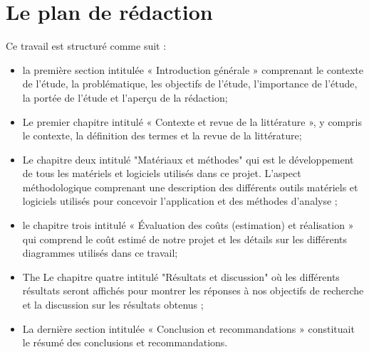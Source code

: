 \documentclass[english,12pt,a4paper]{report}
\begin{document}
\section{Le plan de rédaction }

Ce travail est structuré comme suit :

\begin{itemize}
	\item 	la première section intitulée « Introduction générale » comprenant le contexte de l'étude, la problématique, les objectifs de l'étude, l'importance de l'étude, la portée de l'étude et l'aperçu de la rédaction; 
	\item 	 Le premier chapitre intitulé « Contexte et revue de la littérature », y compris le contexte, la définition des termes et la revue de la littérature; 
	\item 	 Le chapitre deux intitulé "Matériaux et méthodes" qui est le développement de tous les matériels et logiciels utilisés dans ce projet. L'aspect méthodologique comprenant une description des différents outils matériels et logiciels utilisés pour concevoir l'application et des méthodes d'analyse ; 
	\item 	le chapitre trois intitulé « Évaluation des coûts (estimation) et réalisation » qui comprend le coût estimé de notre projet et les détails sur les différents diagrammes utilisés dans ce travail; 
	\item The  Le chapitre quatre intitulé "Résultats et discussion" où les différents résultats seront affichés pour montrer les réponses à nos objectifs de recherche et la discussion sur les résultats obtenus ; 
	\item  La dernière section intitulée « Conclusion et recommandations » constituait le résumé des conclusions et recommandations. 
\end{itemize}
\end{document}
